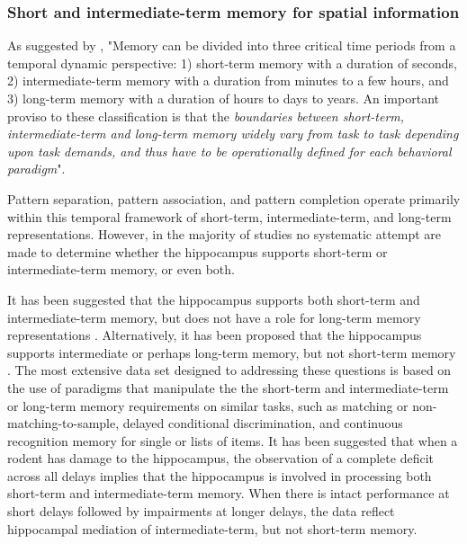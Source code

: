 \documentclass[doc, longtable]{apa6}
\begin{document}
\subsubsection{Short and intermediate-term memory for spatial information}
As suggested by \textcite{kesner2006mnemonic}, "Memory can be divided into three critical time periods from a temporal dynamic perspective: 1) short-term memory with a duration of seconds, 2) intermediate-term memory with a duration from minutes to a few hours, and 3) long-term memory with a duration of hours to days to years. An important proviso to these classification is that the \textit{boundaries between short-term, intermediate-term and long-term memory widely vary from task to task depending upon task demands, and thus have to be operationally defined for each behavioral paradigm}".

Pattern separation, pattern association, and pattern completion operate primarily within this temporal framework of short-term, intermediate-term, and long-term representations. However, in the majority of studies no systematic attempt are made to determine whether the hippocampus supports short-term or intermediate-term memory, or even both.

It has been suggested that the hippocampus supports both short-term and intermediate-term memory, but does not have a role for long-term memory representations \parencite{Lee2002a, Lee2003b, Lee2003}. Alternatively, it has been proposed that the hippocampus supports intermediate or perhaps long-term memory, but not short-term memory \parencite{Alvarez1994a}. The most extensive data set designed to addressing these questions is based on the use of paradigms that manipulate the the short-term and intermediate-term or long-term memory requirements on similar tasks, such as matching or non-matching-to-sample, delayed conditional discrimination, and continuous recognition memory for single or lists of items. It has been suggested that when a rodent has damage to the  hippocampus, the observation of a complete deficit across all delays implies that the hippocampus is involved in processing both short-term and intermediate-term memory. When there is intact performance at short delays followed by impairments at longer delays, the data reflect hippocampal mediation of intermediate-term, but not short-term memory.
\end{document}
